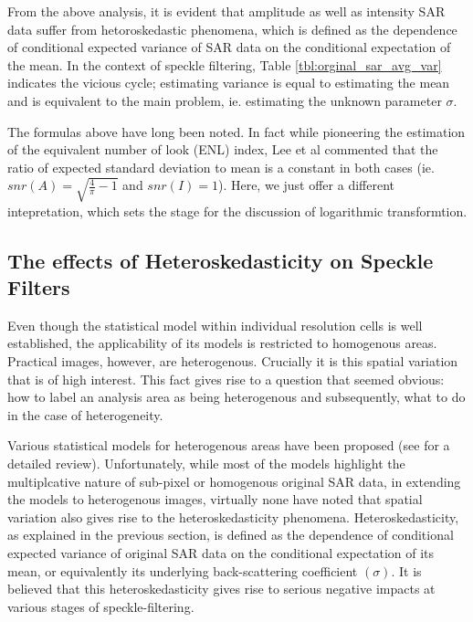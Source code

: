 \documentclass[journal]{IEEEtran}
\begin{document}
From the above analysis, it is evident that amplitude as well as intensity SAR data suffer from hetoroskedastic 
phenomena, which is defined as the dependence of conditional expected variance of SAR data on the conditional 
expectation of the mean. 
In the context of speckle filtering, Table \ref{tbl:orginal_sar_avg_var} indicates the vicious cycle; 
estimating variance is equal to estimating the mean and is equivalent to the main problem, 
ie. estimating the unknown parameter $\sigma$. 

The formulas above have long been noted. In fact while pioneering the estimation of the equivalent number of look 
(ENL) index, Lee et al commented that the ratio of expected standard deviation to mean is a constant in both 
cases (ie. $snr(A)=\sqrt{\frac{4}{\pi}-1}$ and $snr(I)=1$). Here, we just offer a different intepretation, 
which sets the stage for the discussion of logarithmic transformtion. 

\subsection{The effects of Heteroskedasticity on Speckle Filters}

Even though the statistical model within individual resolution cells is well established, the applicability of its 
models is restricted to homogenous areas. 
Practical images, however, are heterogenous. Crucially it is this spatial variation that is of high interest. 
This fact gives rise to a question that seemed obvious: how to label an analysis area as being heterogenous and 
subsequently, what to do in the case of heterogeneity.

Various statistical models for heterogenous areas have been proposed (see \cite{Touzi_2002_TGRS} for a detailed 
review). Unfortunately, while most of the models highlight the multiplcative nature of sub-pixel or homogenous 
original SAR data, in extending the models to heterogenous images, virtually none have noted that spatial variation 
also gives rise to the heteroskedasticity phenomena. 
Heteroskedasticity, as explained in the previous section, is defined as the dependence of conditional expected 
variance of original SAR data on the conditional expectation of its mean, or equivalently its underlying 
back-scattering coefficient $(\sigma)$.
It is believed that this heteroskedasticity gives rise to serious negative impacts at various stages of 
speckle-filtering. 
\end{document}
